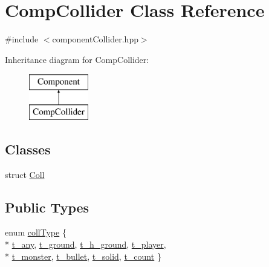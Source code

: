 \hypertarget{class_comp_collider}{\section{Comp\-Collider Class Reference}
\label{class_comp_collider}
}


{\ttfamily \#include $<$component\-Collider.\-hpp$>$}

Inheritance diagram for Comp\-Collider\-:\begin{figure}[H]
\begin{center}
\leavevmode
\includegraphics[height=2.000000cm]{class_comp_collider}
\end{center}
\end{figure}
\subsection*{Classes}
\begin{DoxyCompactItemize}
\item 
struct \hyperlink{struct_comp_collider_1_1_coll}{Coll}
\end{DoxyCompactItemize}
\subsection*{Public Types}
\begin{DoxyCompactItemize}
\item 
enum \hyperlink{class_comp_collider_a9eea092846b889fb5652416832727acd}{coll\-Type} \{ \\*
\hyperlink{class_comp_collider_a9eea092846b889fb5652416832727acda84d56508f27cd1107189cc89ee44e332}{t\-\_\-any}, 
\hyperlink{class_comp_collider_a9eea092846b889fb5652416832727acda69629290cc5045839dcd486f3c8d458a}{t\-\_\-ground}, 
\hyperlink{class_comp_collider_a9eea092846b889fb5652416832727acda8c5a7267b1d940f0c19fb8704f5899af}{t\-\_\-h\-\_\-ground}, 
\hyperlink{class_comp_collider_a9eea092846b889fb5652416832727acda0fcd5631b1e6f7e6f956a2d1394b8a73}{t\-\_\-player}, 
\\*
\hyperlink{class_comp_collider_a9eea092846b889fb5652416832727acdae9d2e0d94944cb55bf1abac61ce322c7}{t\-\_\-monster}, 
\hyperlink{class_comp_collider_a9eea092846b889fb5652416832727acda42cd57ad9c0a9ec4e62eb329f05c1a34}{t\-\_\-bullet}, 
\hyperlink{class_comp_collider_a9eea092846b889fb5652416832727acdace490ff0a60aecd59ce51e347d5da73d}{t\-\_\-solid}, 
\hyperlink{class_comp_collider_a9eea092846b889fb5652416832727acda2c97dc476ec4e0f56502b9098490b7df}{t\-\_\-count}
 \}
\end{DoxyCompactItemize}
